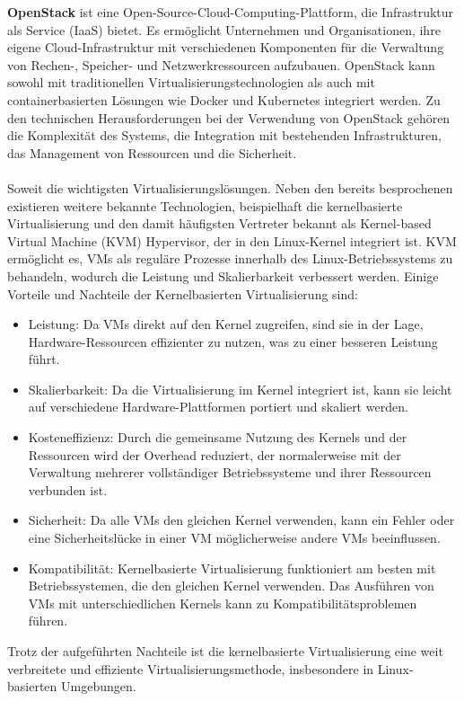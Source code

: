 \documentclass[../vs-script-first-v01.tex]{subfiles}
\begin{document}
\textbf{OpenStack} ist eine Open-Source-Cloud-Computing-Plattform, die Infrastruktur als Service (IaaS) bietet. Es ermöglicht Unternehmen und Organisationen, ihre eigene Cloud-Infrastruktur mit verschiedenen Komponenten für die Verwaltung von Rechen-, Speicher- und Netzwerkressourcen aufzubauen. OpenStack kann sowohl mit traditionellen Virtualisierungstechnologien als auch mit containerbasierten Lösungen wie Docker und Kubernetes integriert werden. Zu den technischen Herausforderungen bei der Verwendung von OpenStack gehören die Komplexität des Systems, die Integration mit bestehenden Infrastrukturen, das Management von Ressourcen und die Sicherheit.
\\\\
Soweit die wichtigsten Virtualisierungslösungen. Neben den bereits besprochenen existieren weitere bekannte Technologien, beispielhaft die kernelbasierte Virtualisierung und den damit häufigsten Vertreter bekannt als Kernel-based Virtual Machine (KVM) Hypervisor, der in den Linux-Kernel integriert ist. KVM ermöglicht es, VMs als reguläre Prozesse innerhalb des Linux-Betriebssystems zu behandeln, wodurch die Leistung und Skalierbarkeit verbessert werden. Einige Vorteile und Nachteile der Kernelbasierten Virtualisierung sind:
\begin{itemize}
\item Leistung: Da VMs direkt auf den Kernel zugreifen, sind sie in der Lage, Hardware-Ressourcen effizienter zu nutzen, was zu einer besseren Leistung führt.
\item Skalierbarkeit: Da die Virtualisierung im Kernel integriert ist, kann sie leicht auf verschiedene Hardware-Plattformen portiert und skaliert werden.
\item Kosteneffizienz: Durch die gemeinsame Nutzung des Kernels und der Ressourcen wird der Overhead reduziert, der normalerweise mit der Verwaltung mehrerer vollständiger Betriebssysteme und ihrer Ressourcen verbunden ist.
\item Sicherheit: Da alle VMs den gleichen Kernel verwenden, kann ein Fehler oder eine Sicherheitslücke in einer VM möglicherweise andere VMs beeinflussen.
\item Kompatibilität: Kernelbasierte Virtualisierung funktioniert am besten mit Betriebssystemen, die den gleichen Kernel verwenden. Das Ausführen von VMs mit unterschiedlichen Kernels kann zu Kompatibilitätsproblemen führen.
\end{itemize}
Trotz der aufgeführten Nachteile ist die kernelbasierte Virtualisierung eine weit verbreitete und effiziente Virtualisierungsmethode, insbesondere in Linux-basierten Umgebungen.
\end{document}
